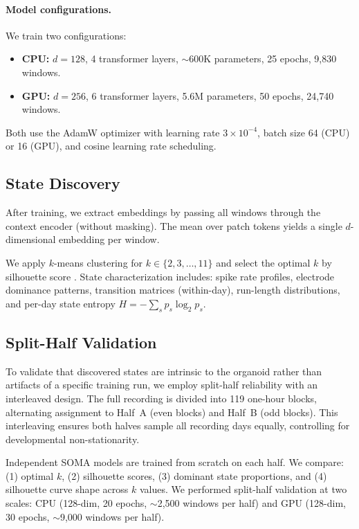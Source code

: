 \documentclass{article}
\begin{document}
\paragraph{Model configurations.} We train two configurations:
\begin{itemize}
    \item \textbf{CPU:} $d = 128$, 4 transformer layers, $\sim$600K parameters, 25 epochs, 9,830 windows.
    \item \textbf{GPU:} $d = 256$, 6 transformer layers, 5.6M parameters, 50 epochs, 24,740 windows.
\end{itemize}

Both use the AdamW optimizer with learning rate $3 \times 10^{-4}$, batch size 64 (CPU) or 16 (GPU), and cosine learning rate scheduling.

\subsection{State Discovery}

After training, we extract embeddings by passing all windows through the context encoder (without masking). The mean over patch tokens yields a single $d$-dimensional embedding per window.

We apply $k$-means clustering for $k \in \{2, 3, \ldots, 11\}$ and select the optimal $k$ by silhouette score \citep{rousseeuw1987silhouettes}. State characterization includes: spike rate profiles, electrode dominance patterns, transition matrices (within-day), run-length distributions, and per-day state entropy $H = -\sum_s p_s \log_2 p_s$.

\subsection{Split-Half Validation}

To validate that discovered states are intrinsic to the organoid rather than artifacts of a specific training run, we employ split-half reliability with an interleaved design. The full recording is divided into 119 one-hour blocks, alternating assignment to Half~A (even blocks) and Half~B (odd blocks). This interleaving ensures both halves sample all recording days equally, controlling for developmental non-stationarity.

Independent SOMA models are trained from scratch on each half. We compare: (1) optimal $k$, (2) silhouette scores, (3) dominant state proportions, and (4) silhouette curve shape across $k$ values. We performed split-half validation at two scales: CPU (128-dim, 20 epochs, $\sim$2,500 windows per half) and GPU (128-dim, 30 epochs, $\sim$9,000 windows per half).
\end{document}
